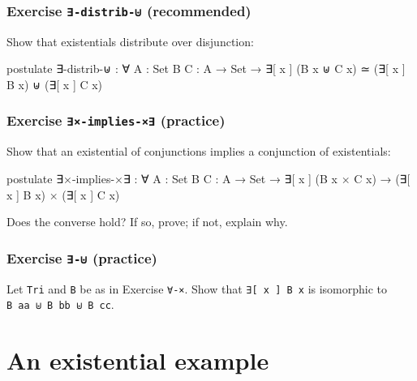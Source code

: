 \hypertarget{exercise--distrib--recommended-1}{%
\subsubsection{\texorpdfstring{Exercise \texttt{∃-distrib-⊎}
(recommended)}{Exercise ∃-distrib-⊎ (recommended)}}\label{exercise--distrib--recommended-1}}

Show that existentials distribute over disjunction:

\begin{fence}
\begin{code}
postulate
  ∃-distrib-⊎ : ∀ {A : Set} {B C : A → Set} →
    ∃[ x ] (B x ⊎ C x) ≃ (∃[ x ] B x) ⊎ (∃[ x ] C x)
\end{code}
\end{fence}

\hypertarget{exercise--implies--practice-1}{%
\subsubsection{\texorpdfstring{Exercise \texttt{∃×-implies-×∃}
(practice)}{Exercise ∃×-implies-×∃ (practice)}}\label{exercise--implies--practice-1}}

Show that an existential of conjunctions implies a conjunction of
existentials:

\begin{fence}
\begin{code}
postulate
  ∃×-implies-×∃ : ∀ {A : Set} {B C : A → Set} →
    ∃[ x ] (B x × C x) → (∃[ x ] B x) × (∃[ x ] C x)
\end{code}
\end{fence}

Does the converse hold? If so, prove; if not, explain why.

\hypertarget{exercise---practice-1}{%
\subsubsection{\texorpdfstring{Exercise \texttt{∃-⊎}
(practice)}{Exercise ∃-⊎ (practice)}}\label{exercise---practice-1}}

Let \texttt{Tri} and \texttt{B} be as in Exercise \texttt{∀-×}. Show
that \texttt{∃{[}\ x\ {]}\ B\ x} is isomorphic to
\texttt{B\ aa\ ⊎\ B\ bb\ ⊎\ B\ cc}.

\hypertarget{an-existential-example}{%
\section{An existential example}\label{an-existential-example}}

